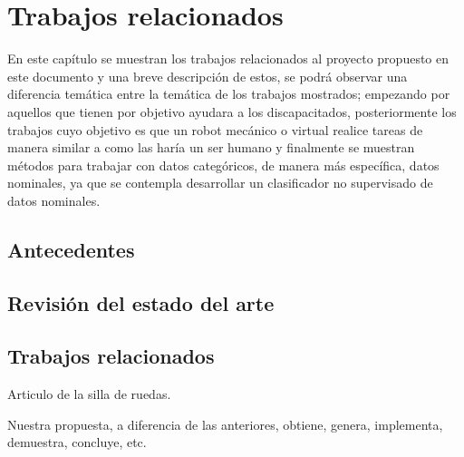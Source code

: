 
\chapter{Trabajos relacionados}

En este cap\'itulo se muestran los trabajos relacionados al proyecto propuesto
 en este documento y una breve descripci\'on de estos, se podr\'a observar una
 diferencia tem\'atica entre la tem\'atica de los trabajos mostrados; empezando 
 por aquellos que tienen por objetivo ayudara a los discapacitados, 
 posteriormente los trabajos cuyo objetivo es que un robot mec\'anico o virtual 
 realice tareas de manera similar a como las har\'ia un ser humano y finalmente 
 se muestran m\'etodos para trabajar con datos categ\'oricos, de manera m\'as 
 espec\'ifica, datos nominales, ya que se contempla desarrollar un clasificador 
 no supervisado de datos nominales.
 
\label{sec:chapter2}
\section{Antecedentes}






\section{Revisi\'{o}n del estado del arte}








\section{Trabajos relacionados}
Articulo de la silla de ruedas.

 Nuestra propuesta, a diferencia de las anteriores, obtiene, genera, implementa, demuestra, concluye, etc.

